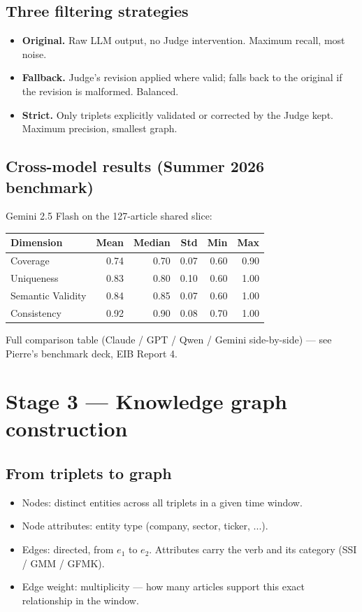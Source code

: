 \documentclass[11pt]{article}
\begin{document}
\subsection{Three filtering strategies}
\begin{itemize}
  \item \textbf{Original.} Raw LLM output, no Judge intervention. Maximum recall, most noise.
  \item \textbf{Fallback.} Judge's revision applied where valid; falls back to the original if the revision is malformed. Balanced.
  \item \textbf{Strict.} Only triplets explicitly validated or corrected by the Judge kept. Maximum precision, smallest graph.
\end{itemize}

\subsection{Cross-model results (Summer 2026 benchmark)}
\label{sec:judge-results}

Gemini 2.5 Flash on the 127-article shared slice:

\begin{center}
\begin{tabular}{lrrrrr}
\toprule
\textbf{Dimension}   & \textbf{Mean} & \textbf{Median} & \textbf{Std} & \textbf{Min} & \textbf{Max} \\
\midrule
Coverage             & 0.74 & 0.70 & 0.07 & 0.60 & 0.90 \\
Uniqueness           & 0.83 & 0.80 & 0.10 & 0.60 & 1.00 \\
Semantic Validity    & 0.84 & 0.85 & 0.07 & 0.60 & 1.00 \\
Consistency          & 0.92 & 0.90 & 0.08 & 0.70 & 1.00 \\
\bottomrule
\end{tabular}
\end{center}

Full comparison table (Claude / GPT / Qwen / Gemini side-by-side) --- see Pierre's benchmark deck, EIB Report 4.

\section{Stage 3 --- Knowledge graph construction}

\subsection{From triplets to graph}
\begin{itemize}
  \item Nodes: distinct entities across all triplets in a given time window.
  \item Node attributes: entity type (company, sector, ticker, ...).
  \item Edges: directed, from \(e_1\) to \(e_2\). Attributes carry the verb and its category (SSI / GMM / GFMK).
  \item Edge weight: multiplicity --- how many articles support this exact relationship in the window.
\end{itemize}
\end{document}
